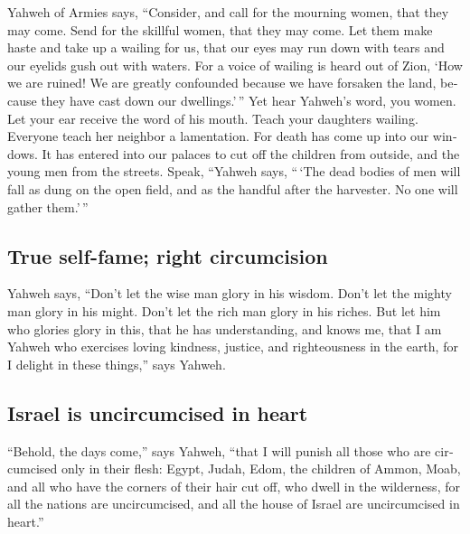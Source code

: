 \begin{paracol}{2}
\begin{otherlanguage}{english}
 Yahweh of Armies says, ``Consider, and call for the
mourning women, that they may come. Send for the skillful women, that
they may come.  Let them make haste and take up a wailing
for us, that our eyes may run down with tears and our eyelids gush out
with waters.  For a voice of wailing is heard out of
Zion, `How we are ruined! We are greatly confounded because we have
forsaken the land, because they have cast down our dwellings.'\,''
 Yet hear Yahweh's word, you women. Let your ear receive
the word of his mouth. Teach your daughters wailing. Everyone teach her
neighbor a lamentation.  For death has come up into our
windows. It has entered into our palaces to cut off the children from
outside, and the young men from the streets.  Speak,
``Yahweh says, ``\,`The dead bodies of men will fall as dung on the open
field, and as the handful after the harvester. No one will gather
them.'\,''

\hypertarget{true-self-fame-right-circumcision}{%
\subsection{True self-fame; right
circumcision}\label{true-self-fame-right-circumcision}}

 Yahweh says, ``Don't let the wise man glory in his
wisdom. Don't let the mighty man glory in his might. Don't let the rich
man glory in his riches.  But let him who glories glory
in this, that he has understanding, and knows me, that I am Yahweh who
exercises loving kindness, justice, and righteousness in the earth, for
I delight in these things,'' says Yahweh.

\hypertarget{israel-is-uncircumcised-in-heart}{%
\subsection{Israel is uncircumcised in
heart}\label{israel-is-uncircumcised-in-heart}}

 ``Behold, the days come,'' says Yahweh, ``that I will
punish all those who are circumcised only in their flesh:
 Egypt, Judah, Edom, the children of Ammon, Moab, and all
who have the corners of their hair cut off, who dwell in the wilderness,
for all the nations are uncircumcised, and all the house of Israel are
uncircumcised in heart.''

\end{otherlanguage}


\end{paracol}
